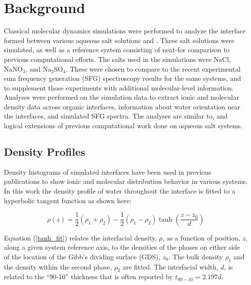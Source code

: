 \section{Background}

Classical molecular dynamics simulations were performed to analyze the interface formed between various aqueous salt solutions and \ctc. Three salt solutions were simulated, as well as a reference system consisting of neat-\wat for comparison to previous computational efforts.\cite{Hore2007,Hore2008,Hore2007a,Walker2006b,Walker2007a,Walker2007b} The salts used in the simulations were NaCl, NaNO$_3$, and Na$_2$SO$_4$. These were chosen to compare to the recent experimental sum frequency generation (SFG) spectroscopy results for the same systems,\cite{McFearin2009} and to supplement those experiments with additional molecular-level information. Analyses were performed on the simulation data to extract ionic and molecular density data across organic interfaces, information about water orientation near the interfaces, and simulated SFG spectra. The analyses are similar to, and logical extensions of previous computational work done on aqueous salt systems.\cite{Hore2008,Hore2007a,Hore2007,Wick2006c,Wick2007a,Wick2008,Walker2008}

\subsection{Density Profiles}
Density histograms of simulated interfaces have been used in previous publications to show ionic and molecular distribution behavior in various systems.\cite{Chang1995,Eggimann2008,Du2008,Wick2006c,Petersen2005a,Hore2008,Walker2006b,Walker2007b} In this work the density profile of water throughout the interface is fitted to a hyperbolic tangent function\cite{Wick2006c,MATSUMOTO1988} as shown here:

\begin{equation}\label{tanh_fit}
	\rho(z) = \frac12(\rho_1+\rho_2) - \frac12\left(\rho_1-\rho_2\right)\tanh\left(\frac{z-z_0}{d}\right)
\end{equation}

Equation (\ref{tanh_fit}) relates the interfacial density, $\rho$, as a function of position, $z$, along a given system reference axis, to the densities of the phases on either side of the location of the Gibb's dividing surface (GDS), $z_0$. The bulk density $\rho_1$ and the density within the second phase, $\rho_2$ are fitted.  The interfacial width, $d$, is related to the ``90-10'' thickness that is often reported by $t_{90-10} = 2.197d$.

